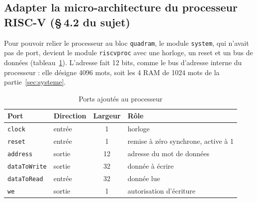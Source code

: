 \subsection{Adapter la micro-architecture du processeur RISC-V (\S\,4.2 du sujet)}
\label{sec:microarchi}

Pour pouvoir relier le processeur au bloc \texttt{quadram}, le module \texttt{system}, qui
n'avait pas de port, devient le module \texttt{riscvproc} avec une horloge, un reset et un bus de
données (tableau~\ref{tab:ports}). L'adresse fait 12 bits, comme le bus d'adresse interne du
processeur : elle désigne 4096 mots, soit les 4 RAM de 1024 mots de la
partie~\ref{sec:systeme}.

\begin{table}[H]
\centering
\begin{tabular}{llcl}
\toprule
Port & Direction & Largeur & Rôle \\
\midrule
\texttt{clock}       & entrée & 1  & horloge \\
\texttt{reset}       & entrée & 1  & remise à zéro synchrone, active à 1 \\
\texttt{address}     & sortie & 12 & adresse du mot de données \\
\texttt{dataToWrite} & sortie & 32 & donnée à écrire \\
\texttt{dataToRead}  & entrée & 32 & donnée lue \\
\texttt{we}          & sortie & 1  & autorisation d'écriture \\
\bottomrule
\end{tabular}
\caption{Ports ajoutés au processeur}
\label{tab:ports}
\end{table}

